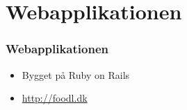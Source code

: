 \section{Webapplikationen}
\begin{frame}
  \frametitle{Webapplikationen}
  \begin{itemize}
    \item Bygget på Ruby on Rails
    \item \url{http://foodl.dk}
  \end{itemize}
\end{frame}
